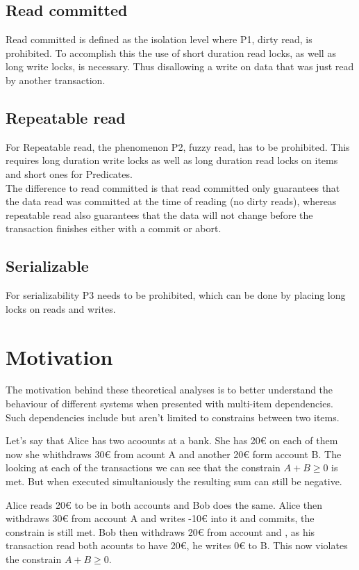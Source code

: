 \documentclass[sigconf, review=true]{acmart}
\begin{document}
\subsection{Read committed}
Read committed is defined as the isolation level where P1, dirty read, is prohibited.
To accomplish this the use of short duration read locks, as well as long write locks, is
necessary. Thus disallowing a write on data that was just read by another transaction.

\subsection{Repeatable read}
For Repeatable read, the phenomenon P2, fuzzy read, has to be prohibited.
This requires long duration write locks as well as long duration read locks on
items and short ones for Predicates.\\
The difference to read committed is that read committed only guarantees that
the data read was committed at the time of reading (no dirty reads), whereas
repeatable read also guarantees that the data will not change before the
transaction finishes either with a commit or abort.


\subsection{Serializable}
For serializability P3 needs to be prohibited, which can be done by placing long locks
on reads and writes.

\section{Motivation}
The motivation behind these theoretical analyses is to better understand the
behaviour of different systems when presented with multi-item dependencies.
Such dependencies include but aren't limited to constrains between two items.

Let's say that Alice has two acoounts at a bank. She has 20€ on each of them now she whithdraws 30€ from acount A and another 20€ form account B.
The looking at each of the transactions we can see that the constrain $A+B \geq 0$ is met.
But when executed simultaniously the resulting sum can still be negative.
\begin{example}
    Alice reads 20€ to be in both accounts and Bob does the same. Alice then withdraws 30€ from account A and writes -10€ into it and commits, the constrain is still met.
    Bob then withdraws 20€ from account and , as his transaction read both acounts to have 20€, he writes 0€  to B. This now violates the constrain $A+B \geq 0$.
\end{example}
\end{document}
